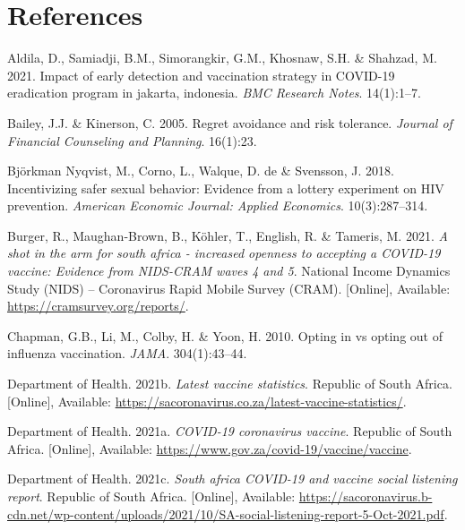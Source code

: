 \documentclass[11pt,preprint, authoryear]{elsarticle}
\numberwithin{equation}{section}
\numberwithin{figure}{section}
\numberwithin{table}{section}
\newlength{\cslhangindent}
\newenvironment{CSLReferences}%
  {\setlength{\parindent}{0pt}%
  \everypar{\setlength{\hangindent}{\cslhangindent}}\ignorespaces}%
  {\par}
\begin{document}
\newpage

\hypertarget{references}{%
\section*{References}\label{references}}

\hypertarget{refs}{}
\begin{CSLReferences}{1}{0}
\leavevmode\hypertarget{ref-erad}{}%
Aldila, D., Samiadji, B.M., Simorangkir, G.M., Khosnaw, S.H. \& Shahzad,
M. 2021. Impact of early detection and vaccination strategy in COVID-19
eradication program in jakarta, indonesia. \emph{BMC Research Notes}.
14(1):1--7.

\leavevmode\hypertarget{ref-regret}{}%
Bailey, J.J. \& Kinerson, C. 2005. Regret avoidance and risk tolerance.
\emph{Journal of Financial Counseling and Planning}. 16(1):23.

\leavevmode\hypertarget{ref-hiv}{}%
Björkman Nyqvist, M., Corno, L., Walque, D. de \& Svensson, J. 2018.
Incentivizing safer sexual behavior: Evidence from a lottery experiment
on HIV prevention. \emph{American Economic Journal: Applied Economics}.
10(3):287--314.

\leavevmode\hypertarget{ref-cram}{}%
Burger, R., Maughan-Brown, B., Köhler, T., English, R. \& Tameris, M.
2021. \emph{A shot in the arm for south africa - increased openness to
accepting a COVID-19 vaccine: Evidence from NIDS-CRAM waves 4 and 5}.
National Income Dynamics Study (NIDS) -- Coronavirus Rapid Mobile Survey
(CRAM). {[}Online{]}, Available: \url{https://cramsurvey.org/reports/}.

\leavevmode\hypertarget{ref-opt}{}%
Chapman, G.B., Li, M., Colby, H. \& Yoon, H. 2010. Opting in vs opting
out of influenza vaccination. \emph{JAMA}. 304(1):43--44.

\leavevmode\hypertarget{ref-stat}{}%
Department of Health. 2021b. \emph{Latest vaccine statistics}. Republic
of South Africa. {[}Online{]}, Available:
\url{https://sacoronavirus.co.za/latest-vaccine-statistics/}.

\leavevmode\hypertarget{ref-herd}{}%
Department of Health. 2021a. \emph{COVID-19 coronavirus vaccine}.
Republic of South Africa. {[}Online{]}, Available:
\url{https://www.gov.za/covid-19/vaccine/vaccine}.

\leavevmode\hypertarget{ref-report}{}%
Department of Health. 2021c. \emph{South africa COVID-19 and vaccine
social listening report}. Republic of South Africa. {[}Online{]},
Available:
\url{https://sacoronavirus.b-cdn.net/wp-content/uploads/2021/10/SA-social-listening-report-5-Oct-2021.pdf}.


\end{CSLReferences}
\end{document}
